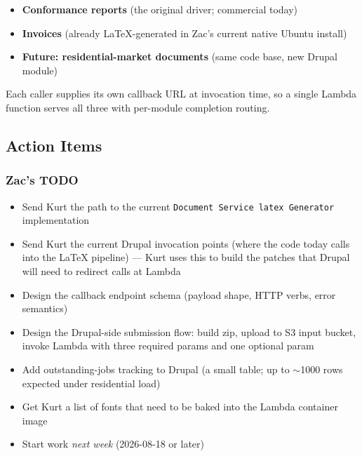 \documentclass[11pt,letterpaper]{article}
\begin{document}
\begin{itemize}[nosep]
  \item \textbf{Conformance reports} (the original driver; commercial today)
  \item \textbf{Invoices} (already LaTeX-generated in Zac's current native Ubuntu install)
  \item \textbf{Future: residential-market documents} (same code base, new Drupal module)
\end{itemize}

Each caller supplies its own callback URL at invocation time, so a single Lambda function serves all three with per-module completion routing.

\subsection{Action Items}
\label{sec:meeting-actions}

\subsubsection{Zac's TODO}
\begin{itemize}[nosep]
  \item Send Kurt the path to the current \texttt{Document Service latex Generator} implementation
  \item Send Kurt the current Drupal invocation points (where the code today calls into the LaTeX pipeline) --- Kurt uses this to build the patches that Drupal will need to redirect calls at Lambda
  \item Design the callback endpoint schema (payload shape, HTTP verbs, error semantics)
  \item Design the Drupal-side submission flow: build zip, upload to S3 input bucket, invoke Lambda with three required params and one optional param
  \item Add outstanding-jobs tracking to Drupal (a small table; up to $\sim$1000 rows expected under residential load)
  \item Get Kurt a list of fonts that need to be baked into the Lambda container image
  \item Start work \emph{next week} (2026-08-18 or later)
\end{itemize}
\end{document}
